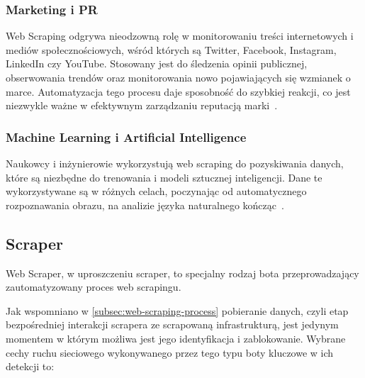 \subsubsection{Marketing i PR}

Web Scraping odgrywa nieodzowną rolę w monitorowaniu treści internetowych i mediów społecznościowych, wśród których są Twitter, Facebook, Instagram, LinkedIn czy YouTube.
Stosowany jest do śledzenia opinii publicznej, obserwowania trendów oraz monitorowania nowo pojawiających się wzmianek o marce.
Automatyzacja tego procesu daje sposobność do szybkiej reakcji, co jest niezwykle ważne w efektywnym zarządzaniu reputacją marki~\cite{monitoring-social-media}.

\subsubsection{Machine Learning i Artificial Intelligence}

Naukowcy i inżynierowie wykorzystują web scraping do pozyskiwania danych, które są niezbędne do trenowania i modeli sztucznej inteligencji.
Dane te wykorzystywane są w różnych celach, poczynając od automatycznego rozpoznawania obrazu, na analizie języka naturalnego kończąc~\cite{openai-data-collection}.

\subsection{Scraper}\label{subsec:scraper}

Web Scraper, w uproszczeniu scraper, to specjalny rodzaj bota przeprowadzający zautomatyzowany proces web scrapingu.

Jak wspomniano w \autoref{subsec:web-scraping-process} pobieranie danych, czyli etap bezpośredniej interakcji scrapera ze scrapowaną infrastrukturą,
jest jedynym momentem w którym możliwa jest jego identyfikacja i zablokowanie.
Wybrane cechy ruchu sieciowego wykonywanego przez tego typu boty kluczowe w ich detekcji to:

